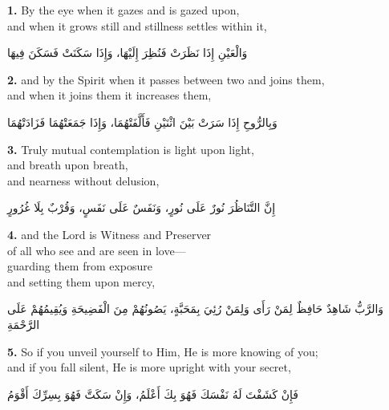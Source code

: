 \documentclass[11pt,a4paper,twoside]{book}
\begin{document}
{\color{indigo}\bfseries 1.}\quad
By the eye when it gazes and is gazed upon,\\
and when it grows still and stillness settles within it,

\begin{flushright}
{\arabicfont
وَالْعَيْنِ إِذَا نَظَرَتْ فَنُظِرَ إِلَيْهَا،
وَإِذَا سَكَنَتْ فَسَكَنَ فِيهَا}
\end{flushright}

\vspace{1em}
{\color{indigo}\bfseries 2.}\quad
and by the Spirit when it passes between two and joins them,\\
and when it joins them it increases them,

\begin{flushright}
{\arabicfont
وَبِالرُّوحِ إِذَا سَرَتْ بَيْنَ اثْنَيْنِ فَأَلَّفَتْهُمَا،
وَإِذَا جَمَعَتْهُمَا فَزَادَتْهُمَا}
\end{flushright}

\vspace{1em}
{\color{indigo}\bfseries 3.}\quad
Truly mutual contemplation is light upon light,\\
and breath upon breath,\\
and nearness without delusion,

\begin{flushright}
{\arabicfont
إِنَّ التَّنَاظُرَ نُورٌ عَلَى نُورٍ،
وَنَفَسٌ عَلَى نَفَسٍ،
وَقُرْبٌ بِلَا غُرُورٍ}
\end{flushright}

\vspace{1em}
{\color{indigo}\bfseries 4.}\quad
and the Lord is Witness and Preserver\\
of all who see and are seen in love---\\
guarding them from exposure\\
and setting them upon mercy,

\begin{flushright}
{\arabicfont
وَالرَّبُّ شَاهِدٌ حَافِظٌ لِمَنْ رَأَى وَلِمَنْ رُئِيَ بِمَحَبَّةٍ،
يَصُونُهُمْ مِنَ الْفَضِيحَةِ
وَيُقِيمُهُمْ عَلَى الرَّحْمَةِ}
\end{flushright}

\vspace{1em}
{\color{indigo}\bfseries 5.}\quad
So if you unveil yourself to Him, He is more knowing of you;\\
and if you fall silent, He is more upright with your secret,

\begin{flushright}
{\arabicfont
فَإِنْ كَشَفْتَ لَهُ نَفْسَكَ فَهُوَ بِكَ أَعْلَمُ،
وَإِنْ سَكَتَّ فَهُوَ بِسِرِّكَ أَقْوَمُ}
\end{flushright}
\end{document}
